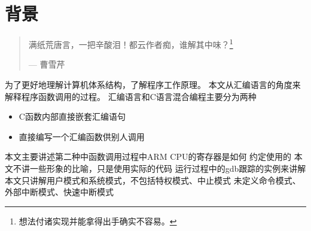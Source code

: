\chapter{背景}

\begin{quotation}
满纸荒唐言，一把辛酸泪！都云作者痴，谁解其中味？\footnote{想法付诸实现并能拿得出手确实不容易。}
\begin{flushright}
--- 曹雪芹
\end{flushright}
\end{quotation}

为了更好地理解计算机体系结构，了解程序工作原理。
本文从汇编语言的角度来解释程序函数调用的过程。
汇编语言和C语言混合编程主要分为两种
\begin{itemize}
    \item C函数内部直接嵌套汇编语句
    \item 直接编写一个汇编函数供别人调用
\end{itemize}
本文主要讲述第二种中函数调用过程中ARM CPU的寄存器是如何
约定使用的
本文不讲一些形象的比喻，只是使用实际的代码
运行过程中的gdb跟踪的实例来讲解
本文只讲解用户模式和系统模式，不包括特权模式、中止模式
未定义命令模式、外部中断模式、快速中断模式
